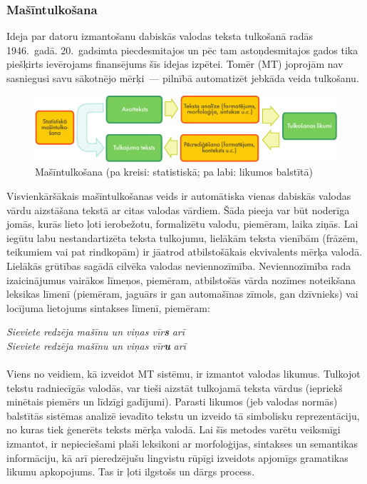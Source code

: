 \begin{multicols}{2}
\subsubsection{Mašīntulkošana}

Ideja par datoru izmantošanu dabiskās valodas teksta tulkošanā radās 1946.~gadā.
20.~gadsimta piecdesmitajos un pēc tam astoņdesmitajos gados tika piešķirts ievērojams finansējums šīs idejas izpētei.
Tomēr  (MT) joprojām nav sasniegusi savu sākotnējo mērķi~--- pilnībā automatizēt jebkāda veida tulkošanu.

\begin{figure}[htb]
  \center
  \includegraphics[width=\textwidth]{../_media/latvian/machine_translation}
  \caption{Mašīntulkošana (pa kreisi: statistiskā; pa labi: likumos balstītā)}
  \label{fig:mtarch_de}
\end{figure}


Visvienkāršākais mašīntulkošanas veids ir automātiska vienas dabiskās valodas vārdu aizstāšana tekstā ar citas valodas vārdiem. 
Šāda pieeja var būt noderīga jomās, kurās lieto ļoti ierobežotu, formalizētu valodu, piemēram, laika ziņās.
Lai iegūtu labu nestandartizēta teksta tulkojumu, lielākām teksta vienībām (frāzēm, teikumiem vai pat rindkopām) ir jāatrod atbilstošākais ekvivalents mērķa valodā. Lielākās grūtības sagādā cilvēka valodas neviennozīmība. 
Neviennozīmība rada izaicinājumus vairākos līmeņos, piemēram, atbilstošās vārda nozīmes noteikšana leksikas līmenī (piemēram, jaguārs ir gan automašīnas zīmols, gan dzīvnieks) vai locījuma lietojums sintakses līmenī, piemēram:

\textit{Sieviete redzēja mašīnu un viņas vīr}\textbf{\textit{s}}\textit{ arī}\\
\textit{Sieviete redzēja mašīnu un viņas vīr}\textbf{\textit{u}}\textit{ arī}\\
\\
Viens no veidiem, kā izveidot MT sistēmu, ir izmantot valodas likumus. 
Tulkojot tekstu radniecīgās valodās, var tieši aizstāt tulkojamā teksta vārdus (iepriekš minētais piemērs un līdzīgi gadījumi). 
Parasti likumos (jeb valodas normās) balstītās sistēmas analizē ievadīto tekstu un izveido tā simbolisku reprezentāciju, no kuras tiek ģenerēts teksts mērķa valodā. 
Lai šīs metodes varētu veiksmīgi izmantot, ir nepieciešami plaši leksikoni ar morfoloģijas, sintakses un semantikas informāciju, kā arī pieredzējušu lingvistu rūpīgi izveidots apjomīgs gramatikas likumu apkopojums. 
Tas ir ļoti ilgstošs un dārgs process.


\end{multicols}
